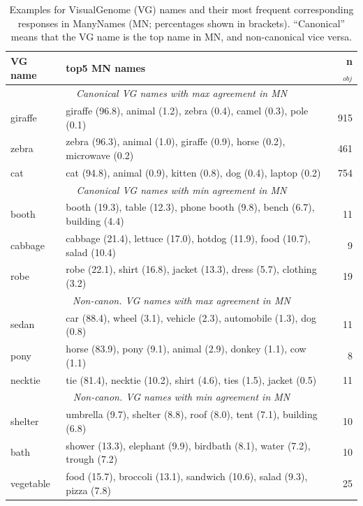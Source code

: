 \begin{table}
\small
\begin{tabular}{lp{4.8cm}r}
\toprule
VG name &  top5 MN names &  n$_{obj}$  \\
\midrule
\multicolumn{3}{c}{\it Canonical VG names with max agreement in MN}\\
 giraffe &  giraffe (96.8), animal (1.2), zebra (0.4), camel (0.3), pole (0.1) &  915 \\
 zebra &  zebra (96.3), animal (1.0), giraffe (0.9), horse (0.2), microwave (0.2) &  461  \\
 cat &  cat (94.8), animal (0.9), kitten (0.8), dog (0.4), laptop (0.2) &  754\\
\midrule
\multicolumn{3}{c}{\it Canonical VG names with min agreement in MN}\\
 booth &  booth (19.3), table (12.3), phone booth (9.8), bench (6.7), building (4.4) &  11 \\
 cabbage &  cabbage (21.4), lettuce (17.0), hotdog (11.9), food (10.7), salad (10.4) &  9 \\
 robe &  robe (22.1), shirt (16.8), jacket (13.3), dress (5.7), clothing (3.2) &  19 \\
  \midrule
  \multicolumn{3}{c}{\it Non-canon. VG names with max agreement in MN}\\
 sedan &  car (88.4), wheel (3.1), vehicle (2.3), automobile (1.3), dog (0.8) &  11 \\
 pony &  horse (83.9), pony (9.1), animal (2.9), donkey (1.1), cow (1.1) &  8 \\
 necktie &  tie (81.4), necktie (10.2), shirt (4.6), ties (1.5), jacket (0.5) &  11 \\
 \midrule
   \multicolumn{3}{c}{\it Non-canon. VG names with min agreement in MN}\\
 shelter &  umbrella (9.7), shelter (8.8), roof (8.0), tent (7.1), building (6.8) &  10 \\
 bath &  shower (13.3), elephant (9.9), birdbath (8.1), water (7.2), trough (7.2) &  10 \\
 vegetable &  food (15.7), broccoli (13.1), sandwich (10.6), salad (9.3), pizza (7.8) &  25 \\
\bottomrule
\end{tabular}
\caption{Examples for VisualGenome (VG) names and their most frequent corresponding responses in ManyNames (MN; percentages shown in brackets). ``Canonical'' means that the VG name is the top name in MN, and non-canonical vice versa.}
\label{tab:qual}
\end{table}

